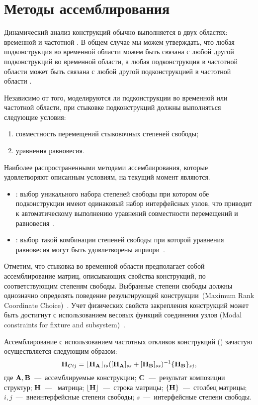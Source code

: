\section{Методы ассемблирования}

Динамический анализ конструкций обычно выполняется в двух областях: временной \cite{lib:coupling:Dong&Shuo, lib:coupling:Gram-Schmidt} и частотной \cite{lib:coupling:Peeters}. В общем случае мы можем утверждать, что любая подконструкция во временной области можем быть связана с любой другой подконструкций во временной области, а любая подконструкция в частотной области может быть связана с любой другой подконструкцией в частотной области \cite{lib:coupling:Valk}. 

Независимо от того, моделируются ли подконструкции во временной или частотной области, при стыковке подконструкций должны выполняться следующие условия:
\begin{enumerate}[noitemsep]
	\item совместность перемещений стыковочных степеней свободы;
	\item уравнения равновесия. 
\end{enumerate}

Наиболее распространенными методами ассемблирования, которые удовлетворяют описанным условиям, на текущий момент являются.
\begin{itemize}
	\item {}: выбор уникального набора степеней свободы при котором обе подконструкции имеют одинаковый набор интерфейсных узлов, что приводит к автоматическому выполнению уравнений совместности перемещений и равновесия~\cite{lib:coupling:Fregolent}.
	\item {}: выбор такой комбинации степеней свободы при которой уравнения равновесия  могут быть удовлетворены априори~\cite{lib:coupling:DAmbrogio}.
\end{itemize}

Отметим, что стыковка во временной области предполагает собой ассемблирование матриц, описывающих свойства конструкций, по соответствующим степеням свободы. Выбранные степени свободы должны однозначно определять поведение результирующей конструкции~(Maximum Rank Coordinate Choice)~\cite{lib:coupling:Allen&Mayes}. Учет физических свойств закрепления конструкций может быть достигнут с использованием весовых функций соединения узлов (Modal constraints for fixture and subsystem)~\cite{lib:coupling:Allen}. 

Ассемблирование с использованием частотных откликов конструкций () зачастую осуществляется следующим образом:
\begin{equation*}
	\mathbf{H}_{Cij} = \lfloor \mathbf{H}_{\mathbf{A}} \rfloor_{is} ([\mathbf{H}_{\mathbf{A}}]_{ss} + [\mathbf{H}_{\mathbf{B}}]_{ss})^{-1} \{ \mathbf{H}_{\mathbf{B}} \}_{sj},
\end{equation*}
где $\mathbf{A}, \mathbf{B}$~---~ассемблируемые конструкции; $\mathbf{C}$~---~результат композиции структур; $\mathbf{H}$~---~ матрица; $\lfloor \mathbf{H} \rfloor$~---~строка  матрицы; $\{ \mathbf{H} \}$~---~столбец  матрицы; $ i, j $~---~внеинтерфейсные степени свободы; $ s $~---~интерфейсные степени свободы.

